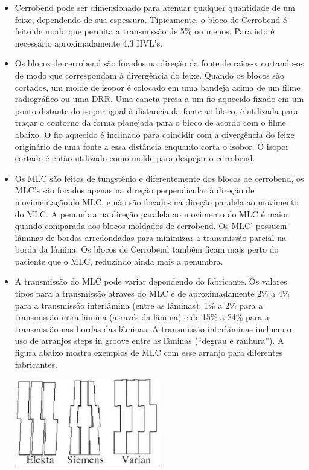 \documentclass[11pt,a4paper]{article}
\newcounter{exemplo}
\begin{document}
\begin{exemplo}
\begin{itemize}
        \item Cerrobend pode ser dimensionado para atenuar qualquer quantidade de um feixe, dependendo de sua espessura. Tipicamente, o bloco de Cerrobend é feito de modo que permita a transmissão de 5\% ou menos. Para isto é necessário aproximadamente 4.3 HVL's.
        
        \item Os blocos de cerrobend são focados na direção da fonte de raios-x cortando-os de modo que correspondam à divergência do feixe. Quando os blocos são cortados, um molde de isopor é colocado em uma bandeja acima de um filme radiográfico ou uma DRR. Uma caneta presa a um fio aquecido fixado em um ponto distante do isopor igual à distancia da fonte ao bloco, é utilizada para traçar o contorno da forma planejada para o bloco de acordo com o filme abaixo. O fio aquecido é inclinado para coincidir com a divergência do feixe originário de uma fonte a essa distância enquanto corta o isobor. O isopor cortado é então utilizado como molde para despejar o cerrobend. 

        \item Os MLC são feitos de tungstênio e diferentemente dos blocos de cerrobend, os MLC's são focados apenas na direção perpendicular à direção de movimentação do MLC, e não são focados na direção paralela ao movimento do MLC. A penumbra na direção paralela ao movimento do MLC é maior quando comparada aos blocos moldados de cerrobend. Os MLC' possuem lâminas de bordas arredondadas para minimizar a transmissão parcial na borda da lâmina. Os blocos de Cerrobend também ficam mais perto do paciente que o MLC, reduzindo ainda mais a penumbra. 
        
        \item A transmissão do MLC pode variar dependendo do fabricante. Os valores tipos para a transmissão atraves do MLC é de aproximadamente 2\% a 4\% para a transmissão interlâmina (entre as lâminas); 1\% a 2\% para a transmissão intra-lâmina (através da lâmina) e de 15\% a 24\% para a transmissão nas bordas das lâminas. A transmissão interlâminas incluem o uso de arranjos steps in groove entre as lâminas (``degrau e ranhura''). A figura abaixo mostra exemplos de MLC com esse arranjo para diferentes fabricantes. 
        
            \begin{center}
                \includegraphics[width=0.5\textwidth]{Imagens/tongueInGroove.JPG}
            \end{center}
        

\end{itemize}
\end{exemplo}
\end{document}
